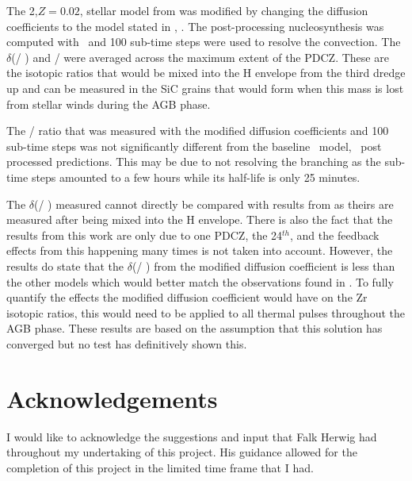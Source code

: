 \documentclass[fleqn,usenatbib]{mnras}
\begin{document}
The 2\Msun,$Z=0.02$, stellar model from \citet{models} was modified by changing the diffusion coefficients to the model stated in \citet{4pi}, . The post-processing nucleosynthesis was computed with \mppnp~and 100 sub-time steps were used to resolve the convection. The  $\delta$(\zirconium[96] / \zirconium[94]) and \xenon[128] / \xenon[130] were averaged across the maximum extent of the PDCZ. These are the isotopic ratios that would be mixed into the H envelope from the third dredge up and can be measured in the SiC grains that would form when this mass is lost from stellar winds during the AGB phase.

The \xenon[128] / \xenon[130] ratio that was measured with the modified diffusion coefficients and 100 sub-time steps was not significantly different from the baseline \MESA~model, \mppnp~post processed predictions. This may be due to not resolving the \iodine[128] branching as the sub-time steps amounted to a few hours while its half-life is only 25 minutes. 

The $\delta$(\zirconium[96] / \zirconium[94]) measured cannot directly be compared with results from \citep{zr} as theirs are measured after being mixed into the H envelope. There is also the fact that the results from this work are only due to one PDCZ, the 24$^{th}$, and the feedback effects from this happening many times is not taken into account. However, the results do state that the $\delta$(\zirconium[96] / \zirconium[94]) from the modified diffusion coefficient is less than the other models which would better match the observations found in \citep{grain}. To fully quantify the effects the modified diffusion coefficient would have on the Zr isotopic ratios, this would need to be applied to all thermal pulses throughout the AGB phase. These results are based on the assumption that this solution has converged but no test has definitively shown this.

 

\section*{Acknowledgements}

I would like to acknowledge the suggestions and input that Falk Herwig had throughout my undertaking of this project. His guidance allowed for the completion of this project in the limited time frame that I had.













\bsp	%
\label{lastpage}
\end{document}
